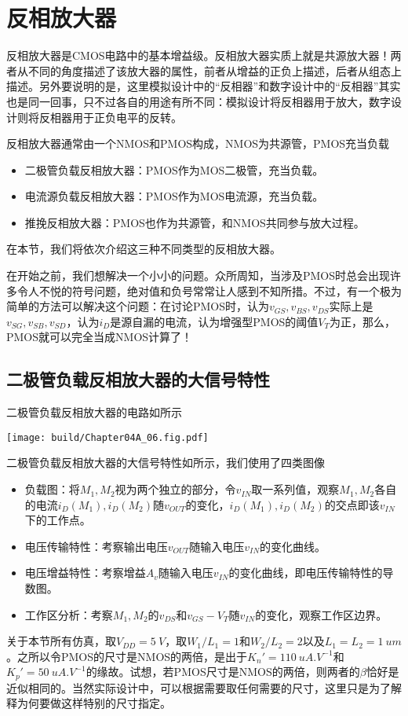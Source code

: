\section{反相放大器}
反相放大器是CMOS电路中的基本增益级。反相放大器实质上就是共源放大器！两者从不同的角度描述了该放大器的属性，前者从增益的正负上描述，后者从组态上描述。另外要说明的是，这里模拟设计中的“反相器”和数字设计中的“反相器”其实也是同一回事，只不过各自的用途有所不同：模拟设计将反相器用于放大，数字设计则将反相器用于正负电平的反转。

反相放大器通常由一个NMOS和PMOS构成，NMOS为共源管，PMOS充当负载
\begin{itemize}
    \item 二极管负载反相放大器：PMOS作为MOS二极管，充当负载。
    \item 电流源负载反相放大器：PMOS作为MOS电流源，充当负载。
    \item 推挽反相放大器：PMOS也作为共源管，和NMOS共同参与放大过程。 
\end{itemize}

在本节，我们将依次介绍这三种不同类型的反相放大器。

在开始之前，我们想解决一个小小的问题。众所周知，当涉及PMOS时总会出现许多令人不悦的符号问题，绝对值和负号常常让人感到不知所措。不过，有一个极为简单的方法可以解决这个问题：在讨论PMOS时，认为$v_{GS},v_{BS},v_{DS}$实际上是$v_{SG},v_{SB},v_{SD}$，认为$i_D$是源自漏的电流，认为增强型PMOS的阈值$V_T$为正，那么，PMOS就可以完全当成NMOS计算了！

\subsection{二极管负载反相放大器的大信号特性}
二极管负载反相放大器的电路如所示
\begin{Figure}[二极管负载反相放大器]
    \texttt{[image: build/Chapter04A\_06.fig.pdf]}
\end{Figure}
二极管负载反相放大器的大信号特性如所示，我们使用了四类图像
\begin{itemize}
    \item 负载图：将$M_1,M_2$视为两个独立的部分，令$v_{IN}$取一系列值，观察$M_1,M_2$各自的电流$i_D(M_1),i_D(M_2)$随$v_{OUT}$的变化，$i_D(M_1),i_D(M_2)$的交点即该$v_{IN}$下的工作点。
    \item 电压传输特性：考察输出电压$v_{OUT}$随输入电压$v_{IN}$的变化曲线。
    \item 电压增益特性：考察增益$A_v$随输入电压$v_{IN}$的变化曲线，即电压传输特性的导数图。
    \item 工作区分析：考察$M_1,M_2$的$v_{DS}$和$v_{GS}-V_T$随$v_{IN}$的变化，观察工作区边界。
\end{itemize} 
关于本节所有仿真，取$V_{DD}=\SI{5}{V}$，取$W_1/L_1=1$和$W_2/L_2=2$以及$L_1=L_2=\SI{1}{um}$。之所以令PMOS的尺寸是NMOS的两倍，是出于$K_n'=\SI{110}{uA.V^{-1}}$和$K_p'=\SI{50}{uA.V^{-1}}$的缘故。试想，若PMOS尺寸是NMOS的两倍，则两者的$\beta$恰好是近似相同的。当然实际设计中，可以根据需要取任何需要的尺寸，这里只是为了解释为何要做这样特别的尺寸指定。

